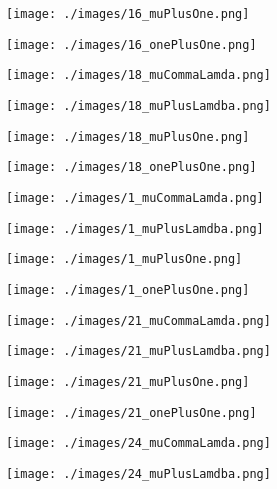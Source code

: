\documentclass[landscape,11pt]{article}
\begin{document}
\begin{figure}
    \centering
    \texttt{[image: ./images/16\_muPlusOne.png]}
\end{figure}\begin{figure}
    \centering
    \texttt{[image: ./images/16\_onePlusOne.png]}
\end{figure}\begin{figure}
    \centering
    \texttt{[image: ./images/18\_muCommaLamda.png]}
\end{figure}\begin{figure}
    \centering
    \texttt{[image: ./images/18\_muPlusLamdba.png]}
\end{figure}\begin{figure}
    \centering
    \texttt{[image: ./images/18\_muPlusOne.png]}
\end{figure}\begin{figure}
    \centering
    \texttt{[image: ./images/18\_onePlusOne.png]}
\end{figure}\begin{figure}
    \centering
    \texttt{[image: ./images/1\_muCommaLamda.png]}
\end{figure}\begin{figure}
    \centering
    \texttt{[image: ./images/1\_muPlusLamdba.png]}
\end{figure}\begin{figure}
    \centering
    \texttt{[image: ./images/1\_muPlusOne.png]}
\end{figure}\begin{figure}
    \centering
    \texttt{[image: ./images/1\_onePlusOne.png]}
\end{figure}\begin{figure}
    \centering
    \texttt{[image: ./images/21\_muCommaLamda.png]}
\end{figure}\begin{figure}
    \centering
    \texttt{[image: ./images/21\_muPlusLamdba.png]}
\end{figure}\begin{figure}
    \centering
    \texttt{[image: ./images/21\_muPlusOne.png]}
\end{figure}\begin{figure}
    \centering
    \texttt{[image: ./images/21\_onePlusOne.png]}
\end{figure}\begin{figure}
    \centering
    \texttt{[image: ./images/24\_muCommaLamda.png]}
\end{figure}\begin{figure}
    \centering
    \texttt{[image: ./images/24\_muPlusLamdba.png]}

\end{figure}
\end{document}
